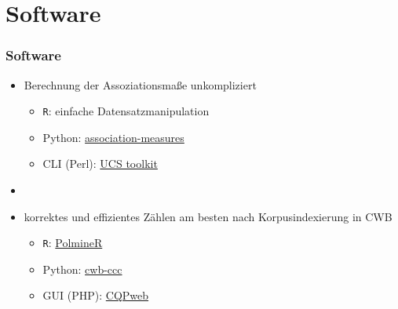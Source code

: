 \documentclass[aspectratio=1610,t]{beamer} %
\begin{document}
\section{Software}
\begin{frame}
  \frametitle{Software}
  \begin{itemize}
  \item Berechnung der Assoziationsmaße unkompliziert
    \begin{itemize}
    \item \texttt{R}: einfache Datensatzmanipulation
    \item Python: \href{https://pypi.org/project/association-measures/}{association-measures}
    \item CLI (Perl): \href{http://www.collocations.de/software.html}{UCS toolkit}
    \end{itemize}
  \item[]
  \item korrektes und effizientes Zählen am besten nach Korpusindexierung in CWB
    \begin{itemize}
    \item \texttt{R}: \href{https://cran.r-project.org/web/packages/polmineR/index.html}{PolmineR}
    \item Python: \href{https://pypi.org/project/cwb-ccc/}{cwb-ccc}
    \item GUI (PHP): \href{https://cwb.sourceforge.io/cqpweb.php}{CQPweb}
    \end{itemize}
  \end{itemize}
\end{frame}
\end{document}
